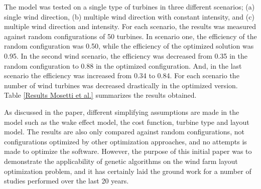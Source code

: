 \noindent The model was tested on a single type of turbines in three different scenarios; (a) single wind direction, (b) multiple wind direction with constant intensity, and (c) multiple wind direction and intensity. For each scenario, the results was measured against random configurations of 50 turbines. In scenario one, the efficiency of the random configuration was 0.50, while the efficiency of the optimized solution was 0.95. In the second wind scenario, the efficiency was decreased from 0.35 in the random configuration to 0.88 in the optimized configuration. And, in the last scenario the efficiency was increased from 0.34 to 0.84. For each scenario the number of wind turbines was decreased drastically in the optimized version. Table \ref{Results Mosetti et al.} summarizes the results obtained.

\begin{center}
\begin{table}[h!]
\caption{Optimized configurations compared against random configurations for each of the three scenarios (a) single wind direction, (b) multiple wind direction with constant intensity and (c) multiple wind direction and intensity {\citep{Mosetti}}.}
\label{Results Mosetti et al.}
\end{table}
\end{center}


\noindent As discussed in the paper, different simplifying assumptions are made in the model such as the wake effect model, the cost function, turbine type and layout model. The results are also only compared against random configurations, not configurations optimized by other optimization approaches, and no attempts is made to optimize the software. However, the purpose of this initial paper was to demonstrate the applicability of genetic algorithms on the wind farm layout optimization problem, and it has certainly laid the ground work for a number of studies performed over the last 20 years. \\


